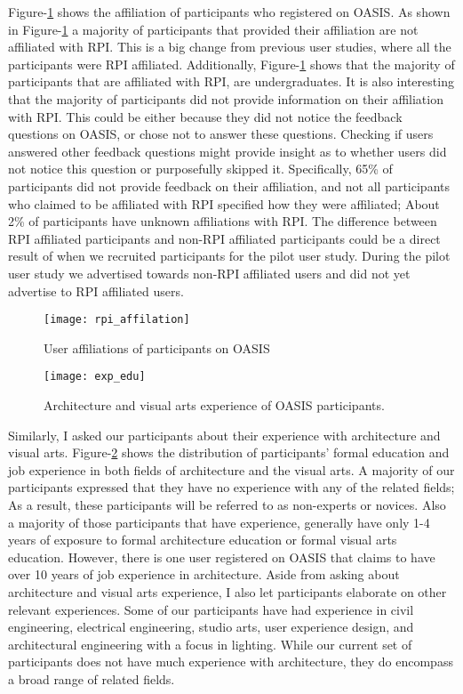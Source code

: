Figure-\ref{fig:rpi_affilation} shows the affiliation of participants who registered on OASIS.
As shown in Figure-\ref{fig:rpi_affilation} a majority of participants that provided their affiliation are not affiliated with RPI. 
This is a big change from previous user studies, where all the participants were RPI affiliated.
Additionally, Figure-\ref{fig:rpi_affilation} shows that the majority of participants that are affiliated with RPI, are undergraduates.
It is also interesting that the majority of participants did not provide information on their affiliation with RPI.
This could be either because they did not notice the feedback questions on OASIS, or chose not to answer these questions.
Checking if users answered other feedback questions might provide insight as to whether users did not notice this question or purposefully skipped it. 
Specifically, 65\% of participants did not provide feedback on their affiliation, and not all participants who claimed to be affiliated with RPI specified how they were affiliated;
About 2\% of participants have unknown affiliations with RPI.
The difference between RPI affiliated participants and non-RPI affiliated participants could be a direct result of when we recruited participants for the pilot user study.
During the pilot user study we advertised towards non-RPI affiliated users and did not yet advertise to RPI affiliated users. 

	\begin{figure}[!ht]
	\centering
	\caption{User affiliations of participants on OASIS}
	\label{fig:rpi_affilation}
	\texttt{[image: rpi\_affilation]}
	\end{figure}

	\begin{figure}[!ht]
	\centering
	\caption{Architecture and visual arts experience of OASIS participants.}
	\label{fig:exp_edu}
	\texttt{[image: exp\_edu]}
	\end{figure}

Similarly, I asked our participants about their experience with architecture and visual arts.
Figure-\ref{fig:exp_edu} shows the distribution of participants' formal education and job experience in both fields of architecture and the visual arts.
A majority of our participants expressed that they have no experience with any of the related fields;
As a result, these participants will be referred to as non-experts or novices.
Also a majority of those participants that have experience, generally have only 1-4 years of exposure to formal architecture education or formal visual arts education.
However, there is one user registered on OASIS that claims to have over 10 years of job experience in architecture.
Aside from asking about architecture and visual arts experience, I also let participants elaborate on other relevant experiences. 
Some of our participants have had experience in civil engineering, electrical engineering, studio arts, user experience design, and architectural engineering with a focus in lighting.
While our current set of participants does not have much experience with architecture, they do encompass a broad range of related fields.\\

